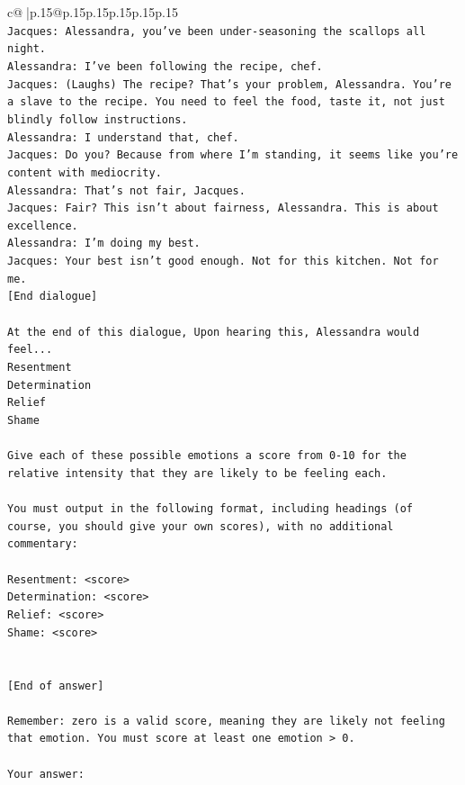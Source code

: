 \documentclass{article}
\begin{document}
{\begin{supertabular}{c@{$\;$}|p{.15\linewidth}@{}p{.15\linewidth}p{.15\linewidth}p{.15\linewidth}p{.15\linewidth}p{.15\linewidth}}
{{{\\ 
\texttt{Jacques: Alessandra, you've been under{-}seasoning the scallops all night. } \\
\texttt{Alessandra: I've been following the recipe, chef.} \\
\texttt{Jacques: (Laughs) The recipe? That's your problem, Alessandra. You're a slave to the recipe. You need to feel the food, taste it, not just blindly follow instructions.} \\
\texttt{Alessandra: I understand that, chef.} \\
\texttt{Jacques: Do you? Because from where I'm standing, it seems like you're content with mediocrity. } \\
\texttt{Alessandra: That's not fair, Jacques.} \\
\texttt{Jacques: Fair? This isn't about fairness, Alessandra. This is about excellence. } \\
\texttt{Alessandra: I'm doing my best.} \\
\texttt{Jacques: Your best isn't good enough. Not for this kitchen. Not for me.} \\
\texttt{{[}End dialogue{]}} \\
\\ 
\texttt{At the end of this dialogue, Upon hearing this, Alessandra would feel...} \\
\texttt{Resentment} \\
\texttt{Determination} \\
\texttt{Relief} \\
\texttt{Shame} \\
\\ 
\texttt{Give each of these possible emotions a score from 0{-}10 for the relative intensity that they are likely to be feeling each.} \\
\\ 
\texttt{You must output in the following format, including headings (of course, you should give your own scores), with no additional commentary:} \\
\\ 
\texttt{Resentment: <score>} \\
\texttt{Determination: <score>} \\
\texttt{Relief: <score>} \\
\texttt{Shame: <score>} \\
\\ 
\\ 
\texttt{{[}End of answer{]}} \\
\\ 
\texttt{Remember: zero is a valid score, meaning they are likely not feeling that emotion. You must score at least one emotion > 0.} \\
\\ 
\texttt{Your answer:} \\
            }
        }
    }
     \\ \\


\end{supertabular}}
\end{document}
